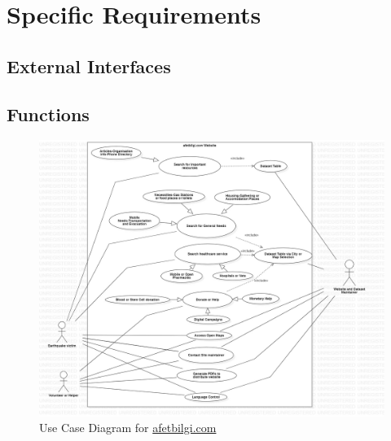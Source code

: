 \section{Specific Requirements}

\subsection{External Interfaces}

\subsection{Functions}

\begin{figure}[H]
  \centering
  \includegraphics[width=\textwidth]{img/use-case-diagram.jpg}
  \caption{Use Case Diagram for \href{https://afetbilgi.com}{afetbilgi.com}}
\end{figure}

